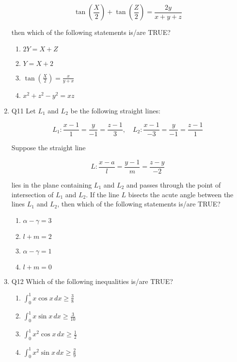 \documentclass{article}
\begin{document}
\begin{enumerate}
\[
    \tan\left(\frac{X}{2}\right) + \tan\left(\frac{Z}{2}\right) = \frac{2y}{x + y + z}
\]

    then which of the following statements is/are TRUE?

    \begin{enumerate}
        \item  $2Y = X + Z$
        \item  $Y = X + 2$
        \item  $\tan\left(\frac{X}{2}\right) = \frac{x}{y + x}$
        \item  $x^2 + z^2 - y^2 = xz$
    \end{enumerate}

\item Q11 Let $L_1$ and $L_2$ be the following straight lines:

\[
    L_1 :\frac{x - 1}{1} = \frac{y}{-1} = \frac{z - 1}{3}, \quad 
    L_2 : \frac{x - 1}{-3} = \frac{y}{-1} = \frac{z - 1}{1}
\]

    Suppose the straight line 

\[
    L : \frac{x - a}{l} = \frac{y - 1}{m} = \frac{z - y}{-2}
\]

    lies in the plane containing $L_1$ and $L_2$ and passes through the point of intersection of $L_1$ and $L_2$. If the line $L$ bisects the acute angle between the lines $L_1$ and $L_2$, then which of the following statements is/are TRUE?

    \begin{enumerate}
        \item  $\alpha - \gamma = 3$
        \item  $l + m = 2$
        \item  $\alpha - \gamma = 1$
        \item  $l + m = 0$
    \end{enumerate}

\item Q12 Which of the following inequalities is/are TRUE?

    \begin{enumerate}
        \item  $\int_0^1 x \cos x \,dx \geq \frac{3}{8}$
        \item  $\int_0^1 x \sin x \,dx \geq \frac{3}{10}$
        \item  $\int_0^1 x^2 \cos x \,dx \geq \frac{1}{2}$
        \item  $\int_0^1 x^2 \sin x \,dx \geq \frac{2}{9}$
    \end{enumerate}


\end{enumerate}
\end{document}
